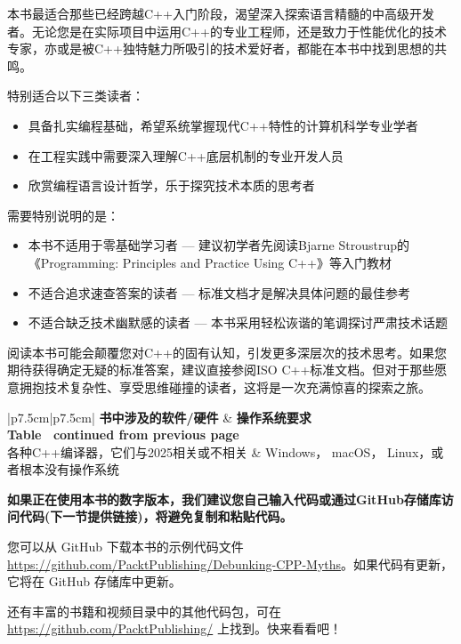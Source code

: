 本书最适合那些已经跨越C++入门阶段，渴望深入探索语言精髓的中高级开发者。无论您是在实际项目中运用C++的专业工程师，还是致力于性能优化的技术专家，亦或是被C++独特魅力所吸引的技术爱好者，都能在本书中找到思想的共鸣。

特别适合以下三类读者：

\begin{itemize}
\item 
具备扎实编程基础，希望系统掌握现代C++特性的计算机科学专业学者

\item 
在工程实践中需要深入理解C++底层机制的专业开发人员

\item 
欣赏编程语言设计哲学，乐于探究技术本质的思考者
\end{itemize}

需要特别说明的是：

\begin{itemize}
\item 
本书不适用于零基础学习者 --- 建议初学者先阅读Bjarne Stroustrup的《Programming: Principles and Practice Using C++》等入门教材

\item 
不适合追求速查答案的读者 --- 标准文档才是解决具体问题的最佳参考

\item 
不适合缺乏技术幽默感的读者 --- 本书采用轻松诙谐的笔调探讨严肃技术话题
\end{itemize}

阅读本书可能会颠覆您对C++的固有认知，引发更多深层次的技术思考。如果您期待获得确定无疑的标准答案，建议直接参阅ISO C++标准文档。但对于那些愿意拥抱技术复杂性、享受思维碰撞的读者，这将是一次充满惊喜的探索之旅。

\begin{longtable}{|p{7.5cm}|p{7.5cm}|}
\hline
\textbf{书中涉及的软件/硬件}          & \textbf{操作系统要求}               \\ \hline
\endfirsthead
%
%
{{\bfseries Table \thetable\ continued from previous page}} \\
\endhead
%
各种C++编译器，它们与2025相关或不相关 & Windows， macOS， Linux，或者根本没有操作系统 \\ \hline
\end{longtable}

\textbf{如果正在使用本书的数字版本，我们建议您自己输入代码或通过GitHub存储库访问代码(下一节提供链接)，将避免复制和粘贴代码。}


您可以从 GitHub 下载本书的示例代码文件 \url{https://github.com/PacktPublishing/Debunking-CPP-Myths}。如果代码有更新，它将在 GitHub 存储库中更新。

还有丰富的书籍和视频目录中的其他代码包，可在 \url{https://github.com/PacktPublishing/} 上找到。快来看看吧！







